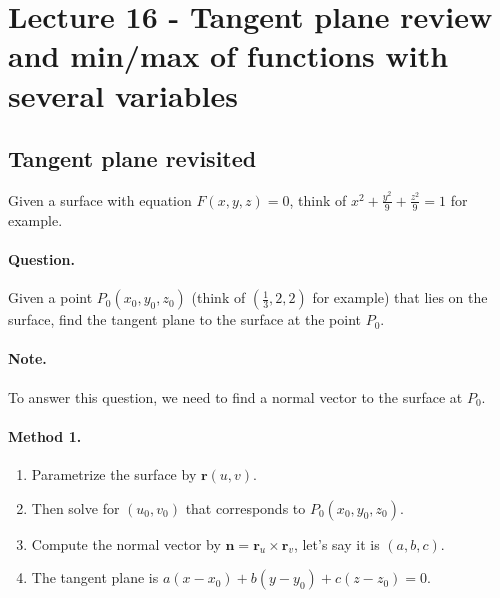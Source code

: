 \setcounter{section}{15}
\section{Lecture 16 - Tangent plane review and min/max of functions with several variables}

\subsection{Tangent plane revisited}
Given a surface with equation $F(x,y,z) = 0$, think of $x^2+\frac{y^2}{9}+\frac{z^2}{9}=1$ for example. 
\paragraph{Question.} Given a point $P_0(x_0,y_0,z_0)$ (think of $\left(\frac{1}{3},2,2\right)$ for example) that lies on the surface, find the tangent plane to the surface at the point $P_0$. 

\paragraph{Note.} To answer this question, we need to find a normal vector to the surface at $P_0$.

\paragraph{Method 1.} 
\begin{enumerate}
    \item Parametrize the surface by $\textbf{r}(u,v)$.
    \item Then solve for $(u_0,v_0)$ that corresponds to $P_0(x_0,y_0,z_0)$.
    \item Compute the normal vector by $\textbf{n} = \textbf{r}_u\times \textbf{r}_v$, let's say it is $(a,b,c)$.
    \item The tangent plane is $a(x-x_0)+b(y-y_0)+c(z-z_0) = 0$.
\end{enumerate}

